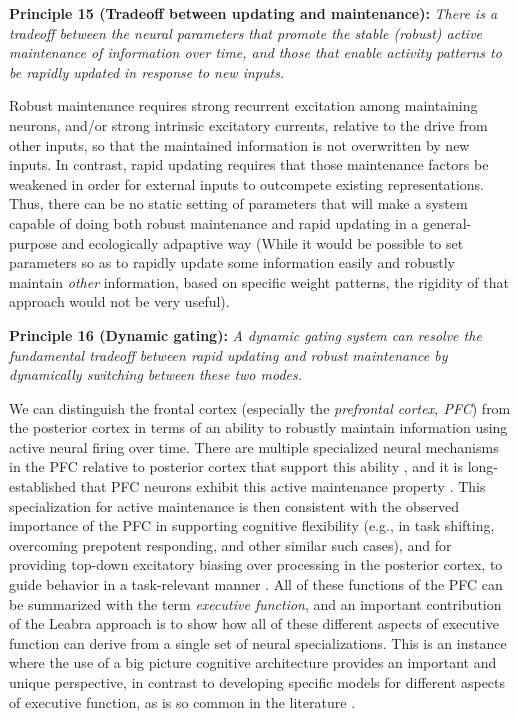 \documentclass[11pt,twoside]{article}
\begin{document}
{\bf Principle 15 (Tradeoff between updating and maintenance):} {\em There is
  a tradeoff between the neural parameters that promote the stable (robust)
  active maintenance of information over time, and those that enable activity
  patterns to be rapidly updated in response to new inputs.}  

Robust maintenance requires strong recurrent excitation among maintaining
neurons, and/or strong intrinsic excitatory currents, relative to the drive
from other inputs, so that the maintained information is not overwritten by
new inputs.  In contrast, rapid updating requires that those maintenance
factors be weakened in order for external inputs to outcompete existing
representations.  Thus, there can be no static setting of parameters that will
make a system capable of doing both robust maintenance and rapid updating in a
general-purpose and ecologically adpaptive way (While it would be possible to
set parameters so as to rapidly update some information easily and robustly
maintain {\em other} information, based on specific weight patterns, the
rigidity of that approach would not be very useful).

{\bf Principle 16 (Dynamic gating):} {\em A dynamic gating system can resolve
  the fundamental tradeoff between rapid updating and robust maintenance by
  dynamically switching between these two modes.}  

We can distinguish the frontal cortex (especially the {\em prefrontal cortex,
  PFC}) from the posterior cortex in terms of an ability to robustly maintain
information using active neural firing over time.  There are multiple
specialized neural mechanisms in the PFC relative to posterior cortex that
support this ability \cite{WangMarkramGoodmanEtAl06,HazyPauliHerdEtAlInPrep},
and it is long-established that PFC neurons exhibit this active maintenance
property
\cite{FusterAlexander71,GoldmanRakic95,KubotaNiki71,MillerEricksonDesimone96,
  MiyashitaChang88}.  This specialization for active maintenance is then
consistent with the observed importance of the PFC in supporting cognitive
flexibility (e.g., in task shifting, overcoming prepotent responding, and
other similar such cases), and for providing top-down excitatory biasing over
processing in the posterior cortex, to guide behavior in a task-relevant
manner \cite{BraverCohen00,CohenDunbarMcClelland90,CohenServanSchrieber89,
  HerdBanichOReilly06,MillerCohen01}.  All of these functions of the PFC can
be summarized with the term {\em executive function}, and an important
contribution of the Leabra approach is to show how all of these different
aspects of executive function can derive from a single set of neural
specializations.  This is an instance where the use of a big picture cognitive
architecture provides an important and unique perspective, in contrast to
developing specific models for different aspects of executive function, as is
so common in the literature \cite{spec-ef-models}.
\end{document}
